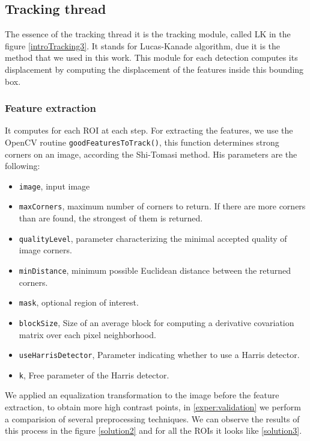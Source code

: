 \subsection{Tracking thread}




The essence of the tracking thread it is the tracking module, called LK in the figure \ref{introTracking3}. It stands for Lucas-Kanade algorithm, due it is the method that we used in this work. This module for each detection computes its displacement by computing the displacement of the features inside this bounding box. 

\subsubsection{Feature extraction}

It computes for each ROI at each step. For extracting the features, we use the OpenCV routine \texttt{goodFeaturesToTrack()}, this function determines strong corners on an image, according the Shi-Tomasi method. His parameters are the following:
 
\begin{itemize}

\item \texttt{image}, input image

\item \texttt{maxCorners}, maximum number of corners to return. If there are more corners than are found, the strongest of them is returned.
\item \texttt{qualityLevel}, parameter characterizing the minimal accepted quality of image corners.
\item \texttt{minDistance}, minimum possible Euclidean distance between the returned corners.
\item \texttt{mask}, optional region of interest.
\item \texttt{blockSize}, Size of an average block for computing a derivative covariation matrix over each pixel neighborhood.
\item \texttt{useHarrisDetector},  Parameter indicating whether to use a Harris detector.
\item \texttt{k},  Free parameter of the Harris detector.

\end{itemize}

We applied an equalization transformation to the image before the feature extraction, to obtain more high contrast points, in \ref{exper:validation} we perform a comparision of several preprocessing techniques. We can observe the results of this process in the figure \ref{solution2} and for all the ROIs it looks like \ref{solution3}.


